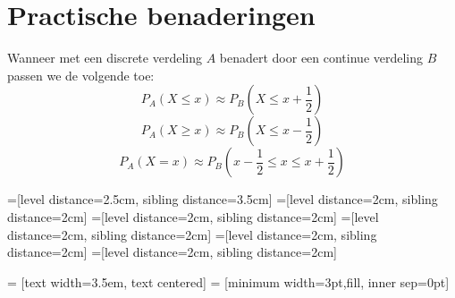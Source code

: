 \documentclass[main.tex]{subfiles}
\begin{document}
\section{Practische benaderingen}
\label{sec:pract-benad}

\begin{de}
  Wanneer met een discrete verdeling $A$ benadert door een continue verdeling $B$ passen we de volgende  toe:
  \[ P_{A}(X\le x) \approx P_{B}\left(X \le x+\frac{1}{2}\right)\]
  \[ P_{A}(X\ge x) \approx P_{B}\left(X \le x-\frac{1}{2}\right)\]
  \[ P_{A}(X=x) \approx P_{B}\left(x-\frac{1}{2} \le x \le x+\frac{1}{2}\right) \]
\end{de}

=[level distance=2.5cm, sibling distance=3.5cm]
=[level distance=2cm, sibling distance=2cm]
=[level distance=2cm, sibling distance=2cm]
=[level distance=2cm, sibling distance=2cm]
=[level distance=2cm, sibling distance=2cm]
=[level distance=2cm, sibling distance=2cm]

 = [text width=3.5em, text centered]
 = [minimum width=3pt,fill, inner sep=0pt]

\end{document}
